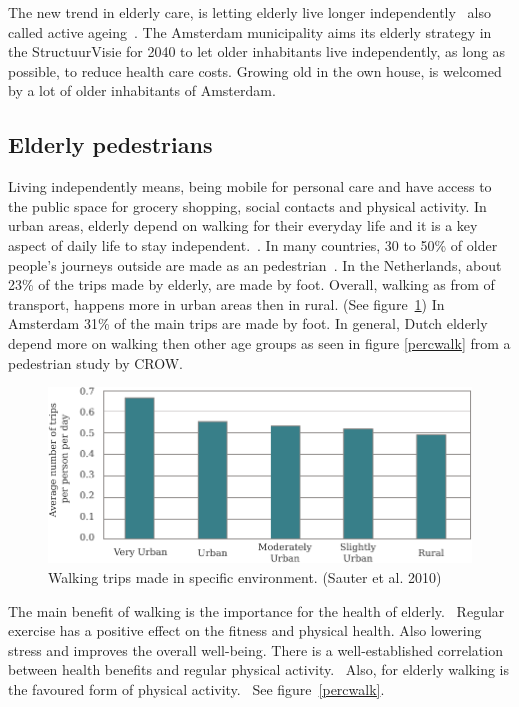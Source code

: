 The new trend in elderly care, is letting elderly live longer independently~\cite{MENSenSTRAAT2014, VandeRidder2008} also called active ageing~\cite{Annear2014}. The Amsterdam municipality aims its elderly strategy in the StructuurVisie for 2040 to let older inhabitants live independently, as long as possible, to reduce health care costs. Growing old in the own house, is welcomed by a lot of older inhabitants of Amsterdam.~\cite{Bossink2011}

\subsection{Elderly pedestrians}
Living independently means, being mobile for personal care and have access to the public space for grocery shopping, social contacts and physical activity. In urban areas, elderly depend on walking for their everyday life and it is a key aspect of daily life to stay independent.~\cite{OECD2001}.
In many countries, 30 to 50\% of older people's journeys outside are made as an pedestrian~\cite{Stahl2013}. In the Netherlands, about 23\% of the trips made by elderly, are made by foot. Overall, walking as from of transport, happens more in urban areas then in rural. (See figure~\ref{walktrip}) In Amsterdam 31\% of the main trips are made by foot. In general, Dutch elderly depend more on walking then other age groups as seen in figure \ref{percwalk} from a pedestrian study by CROW.~\cite{Eijnde2011, Sauter2010, Crow2014}

\begin{figure}[h]
\includegraphics[width=\textwidth]{img/I2_urbanwalks.pdf}
\centering
\caption[Walking trips made in specific environment.]{Walking trips made in specific environment. (Sauter et al. 2010)
\label{walktrip}} 
\end{figure}

The main benefit of walking is the importance for the health of elderly.~\cite{Borst2008} Regular exercise has a positive effect on the fitness and physical health. Also lowering stress and improves the overall well-being. There is a well-established correlation between health benefits and regular physical activity.~\cite{Annear2014} Also, for elderly walking is the favoured form of physical activity.~\cite{Borst2008} See figure~\ref{percwalk}.

